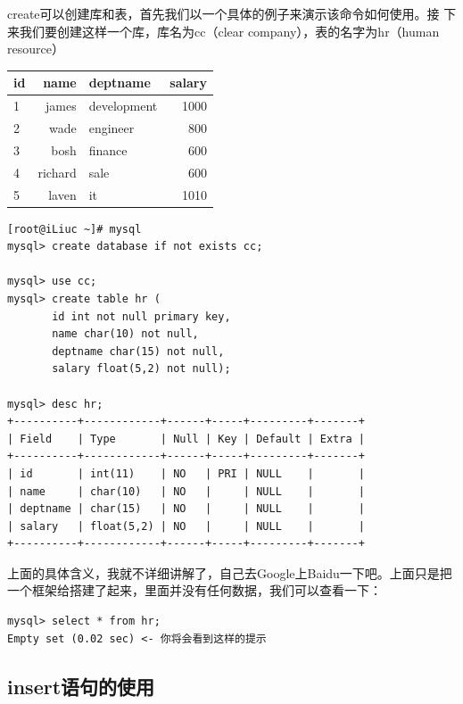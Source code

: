create可以创建库和表，首先我们以一个具体的例子来演示该命令如何使用。接
下来我们要创建这样一个库，库名为cc（clear company），表的名字为hr（human
resource）

\begin{table}[h]
  \centering
  \begin{tabular}{lrlr}
    \toprule
    id   & name    & deptname       & salary \\
    \midrule
    1    & james   & development    & 1000 \\
    2    & wade    & engineer       & 800 \\
    3    & bosh    & finance        & 600 \\
    4    & richard & sale           & 600 \\
    5    & laven   & it             & 1010 \\
    \bottomrule
  \end{tabular}
\end{table}

\small{
\begin{verbatim}
[root@iLiuc ~]# mysql
mysql> create database if not exists cc;

mysql> use cc;
mysql> create table hr (
       id int not null primary key,
       name char(10) not null,
       deptname char(15) not null,
       salary float(5,2) not null);

mysql> desc hr;
+----------+------------+------+-----+---------+-------+
| Field    | Type       | Null | Key | Default | Extra |
+----------+------------+------+-----+---------+-------+
| id       | int(11)    | NO   | PRI | NULL    |       | 
| name     | char(10)   | NO   |     | NULL    |       | 
| deptname | char(15)   | NO   |     | NULL    |       | 
| salary   | float(5,2) | NO   |     | NULL    |       | 
+----------+------------+------+-----+---------+-------+
\end{verbatim}
}
\normalsize

上面的具体含义，我就不详细讲解了，自己去Google上Baidu一下吧。上面只是把
一个框架给搭建了起来，里面并没有任何数据，我们可以查看一下：

\small{
\begin{verbatim}
mysql> select * from hr;
Empty set (0.02 sec) <- 你将会看到这样的提示
\end{verbatim}
}
\normalsize

\subsection{insert语句的使用}

